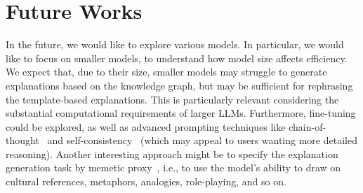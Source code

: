 \section{Future Works}


In the future, we would like to explore various models. In particular, we would like to focus on smaller models, to understand how model size affects efficiency. We expect that, due to their size, smaller models may struggle to generate explanations based on the knowledge graph, but may be sufficient for rephrasing the template-based explanations. This is particularly relevant considering the substantial computational requirements of larger LLMs. Furthermore, fine-tuning could be explored, as well as advanced prompting techniques like chain-of-thought~\cite{weichain} and self-consistency~\cite{wang2022self} (which may appeal to users wanting more detailed reasoning). Another interesting approach might be to specify the explanation generation task by memetic proxy~\cite{reynolds2021prompt}, i.e., to use the model's ability to draw on cultural references, metaphors, analogies, role-playing, and so on. %




